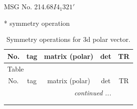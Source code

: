 \documentclass[fleqn,8pt]{jsarticle}
\begin{document}
\setcounter{MaxMatrixCols}{32}

\renewcommand{\tablename}{Table~}
\renewcommand{\figurename}{Figure~}
\begin{center}
\LARGE
MSG No. 214.68\quad$I4_{1}321'$
\end{center}
* symmetry operation
\renewcommand{\arraystretch}{1.3}
\begin{longtable}{ccccc}
\caption{Symmetry operations for 3d polar vector.}
 \\
 \hline \hline
No. & tag & matrix (polar) & det & TR \\ \hline \endfirsthead

\multicolumn{4}{l}{\tablename\ \thetable{}} \\
 \hline \hline
No. & tag & matrix (polar) & det & TR \\ \hline \endhead

 \hline \hline
\multicolumn{4}{r}{\footnotesize\it continued ...} \\ \endfoot

 \hline \hline
\multicolumn{4}{r}{} \\ \endlastfoot


\end{longtable}
\end{document}
